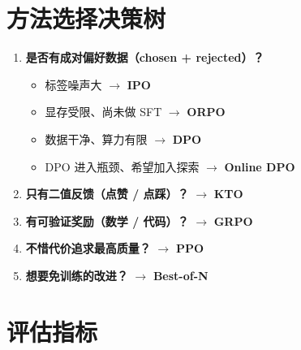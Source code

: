 \section{方法选择决策树}
\label{method-selection-decision-tree}

\begin{enumerate}
  \item \textbf{是否有成对偏好数据（chosen + rejected）？}

\begin{itemize}
  \item 标签噪声大 $\rightarrow$ \textbf{IPO}
  \item 显存受限、尚未做 SFT $\rightarrow$ \textbf{ORPO}
  \item 数据干净、算力有限 $\rightarrow$ \textbf{DPO}
  \item DPO 进入瓶颈、希望加入探索 $\rightarrow$ \textbf{Online DPO}
\end{itemize}
  \item \textbf{只有二值反馈（点赞 / 点踩）？} $\rightarrow$ \textbf{KTO}
  \item \textbf{有可验证奖励（数学 / 代码）？} $\rightarrow$ \textbf{GRPO}
  \item \textbf{不惜代价追求最高质量？} $\rightarrow$ \textbf{PPO}
  \item \textbf{想要免训练的改进？} $\rightarrow$ \textbf{Best-of-N}
\end{enumerate}

\section{评估指标}
\label{evaluation-metrics}

